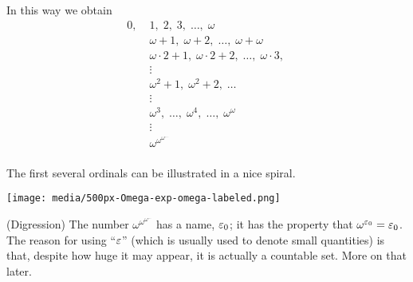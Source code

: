 In this way we obtain
\begin{align*}
	0,\; & 1,\; 2,\; 3,\; \dots,\; \omega \\
	& \omega+1,\; \omega+2,\; \dots,\; \omega+\omega \\
	& \omega \cdot 2 +1,\; \omega \cdot 2 +2,\; \dots,\; \omega \cdot 3,\; \\
	& \vdots \\
	& \omega^2 + 1,\; \omega^2+2,\; \dots \\
	& \vdots \\
	& \omega^3,\; \dots,\; \omega^4,\; \dots,\; \omega^\omega \\
	& \vdots \\
	& \omega^{\omega^{\omega^{\dots}}} \\
\end{align*}

The first several ordinals can be illustrated in a nice spiral.
\begin{center}
	\texttt{[image: media/500px-Omega-exp-omega-labeled.png]}
\end{center}


\begin{remark}
	(Digression)
	The number $\omega^{\omega^{\omega^{\dots}}}$ has a name, $\varepsilon_0$;
	it has the property that $\omega^{\varepsilon_0} = \varepsilon_0$.
	The reason for using ``$\varepsilon$'' (which is usually used to denote small quantities)
	is that, despite how huge it may appear, it is actually a countable set.
	More on that later.
\end{remark}


